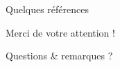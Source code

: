 \documentclass[10pt]{beamer}
\begin{document}
\nocite{*}
\begin{frame}{\large \insertsection}
  \begin{block}{Quelques références}
      \small
      
      
  \end{block} 
\end{frame}

\begin{frame}
    \begin{center}
        Merci de votre attention !
    \end{center}
    \begin{center}
        Questions \& remarques ?
    \end{center}
\end{frame}

\end{document}
